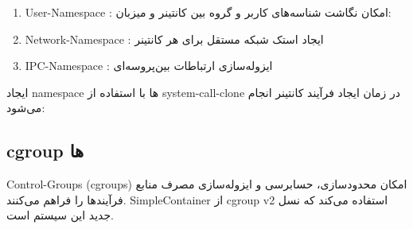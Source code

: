 \documentclass[10pt,a4paper]{article}
\begin{document}
\begin{enumerate}
{{	}
}
\pagebreak
\item 
    User-Namespace : امکان نگاشت شناسه‌های کاربر و گروه بین کانتینر و میزبان:
	  
  {
}

\item 
    Network-Namespace : ایجاد استک شبکه مستقل برای هر کانتینر

\item 
    IPC-Namespace : ایزوله‌سازی ارتباطات بین‌پروسه‌ای


\end{enumerate}

ایجاد namespace‌ ها با استفاده از system-call-clone در زمان ایجاد فرآیند کانتینر انجام می‌شود:
  
{
}

\subsection{cgroup ها}



Control-Groups (cgroups) امکان محدودسازی، حسابرسی و ایزوله‌سازی مصرف منابع فرآیندها را فراهم می‌کنند. SimpleContainer از cgroup v2 استفاده می‌کند که نسل جدید این سیستم است.
\end{document}
